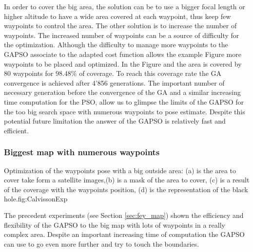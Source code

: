 In order to cover the big area, the solution can be to use a bigger focal length or higher altitude to have a wide area covered at each waypoint, thus keep few waypoints to control the area. The other solution is to increase the number of waypoints. The increased number of waypoints can be a source of difficulty for the optimization. Although the difficulty to manage more waypoints  to the GAPSO associate to the adapted cost function allows the example Figure  more waypoints to be placed and optimized. 
 In the Figure  and  the area is covered by 80 waypoints for $98.48\%$ of coverage. To reach this coverage rate the GA convergence is achieved after 4'856 generations. The important number of necessary generation before the convergence of the GA and a similar  increasing time computation for the PSO, allow us to glimpse the limits of the GAPSO for the too big search space with numerous waypoints to pose estimate. Despite this potential future limitation the answer of the GAPSO is relatively fast and efficient.\\
 

		\subsubsection{Biggest map with numerous waypoints}\label{sec:biggestMapcalWaypoint}
\begin{mfigures}[!]{Optimization of the waypoints pose with a big outside area: (a) is the area to cover take form a satellite images,(b) is a mask of the area to cover, (c) is a result of the coverage with the waypoints position, (d) is the representation of the black hole.}{fig:CalvissonExp} \centering
{}
\hspace{1cm}
\hspace{1cm}
\tabsimuposeCalvisson
\end{mfigures}	

The precedent experiments (see Section \ref{sec:fey_map}) shown the efficiency and flexibility of the GAPSO to the big map with lots of waypoints in a really complex area. Despite an important increasing time of computation the GAPSO can use to go even more further and try to touch the boundaries.  

